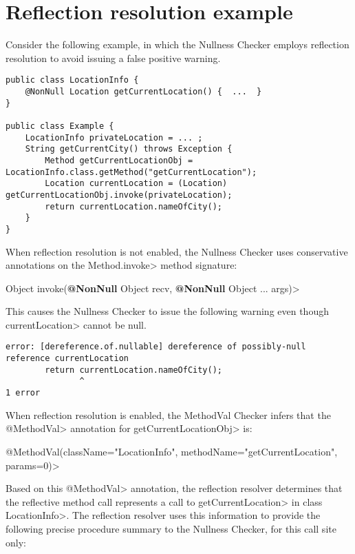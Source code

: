 \section{Reflection resolution example\label{reflection-examples}}

Consider the following example, in which the Nullness Checker employs
reflection resolution to avoid issuing a false positive warning.

\begin{Verbatim}
public class LocationInfo {
    @NonNull Location getCurrentLocation() {  ...  }
}

public class Example {
    LocationInfo privateLocation = ... ;
    String getCurrentCity() throws Exception {
        Method getCurrentLocationObj = LocationInfo.class.getMethod("getCurrentLocation");
        Location currentLocation = (Location) getCurrentLocationObj.invoke(privateLocation);
        return currentLocation.nameOfCity();
    }
}
\end{Verbatim}

When reflection resolution is not enabled, the Nullness Checker uses conservative
annotations on the \<Method.invoke> method signature:

\quad {} Object invoke({\bfseries @NonNull} Object recv, {\bfseries @NonNull} Object ... args)>


This causes the Nullness Checker to issue the following warning even though
\<currentLocation> cannot be null.

\begin{Verbatim}
error: [dereference.of.nullable] dereference of possibly-null reference currentLocation
        return currentLocation.nameOfCity();
               ^
1 error
\end{Verbatim}

\begin{sloppypar}
When reflection resolution is enabled, the MethodVal Checker infers that the \<@MethodVal> annotation for \<getCurrentLocationObj>  is:
\end{sloppypar}
\begin{center}
\<@MethodVal(className="LocationInfo", methodName="getCurrentLocation", params=0)>
\end{center}
Based on this \<@MethodVal> annotation, the reflection resolver determines that
the reflective method call represents a call to \<getCurrentLocation> in class
\<LocationInfo>.
The reflection resolver uses this information to provide the
following precise procedure summary to the Nullness Checker, for this
call site only:

